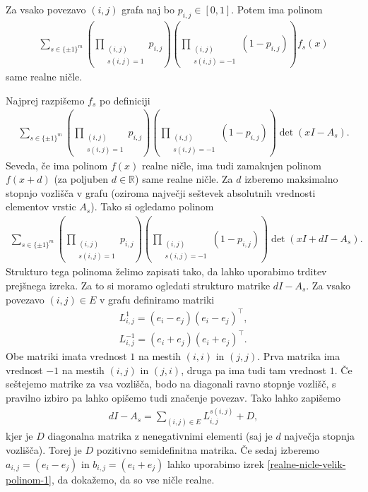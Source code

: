 \begin{izrek}\label{nicle-prepletenih-so-realne}
    Za vsako povezavo \((i,j)\) grafa naj bo \(p_{i,j}\in [0,1]\). Potem ima polinom
    \begin{align*}
        \sum_{s\in \{\pm 1\}^m} \left(\prod_{\substack{(i,j) \\s(i,j)=1}} p_{i,j}\right) \left(\prod_{\substack{(i,j)\\s(i,j)=-1}} (1- p_{i,j})\right) f_s(x)
    \end{align*}
    same realne ničle.
\end{izrek}
\begin{dokaz}
    Najprej razpišemo \(f_s\) po definiciji
    \begin{align*}
        \sum_{s\in \{\pm 1\}^m} \left(\prod_{\substack{(i,j) \\s(i,j)=1}} p_{i,j}\right) \left(\prod_{\substack{(i,j)\\s(i,j)=-1}} (1- p_{i,j})\right) \det(xI - A_s).
    \end{align*}
    Seveda, če ima polinom \(f(x)\) realne ničle, ima tudi zamaknjen polinom \(f(x+d)\) (za poljuben \(d\in \mathbb R\)) same realne ničle. Za \(d\) izberemo maksimalno stopnjo vozlišča v grafu (oziroma največji seštevek absolutnih vrednosti elementov vrstic \(A_s\)). Tako si ogledamo polinom
    \begin{align*}
        \sum_{s\in \{\pm 1\}^m} \left(\prod_{\substack{(i,j) \\s(i,j)=1}} p_{i,j}\right) \left(\prod_{\substack{(i,j)\\s(i,j)=-1}} (1- p_{i,j})\right) \det(xI + dI - A_s).
    \end{align*}
    Strukturo tega polinoma želimo zapisati tako, da lahko uporabimo trditev prejšnega izreka. Za to si moramo ogledati strukturo matrike \(dI - A_s\). Za vsako povezavo \((i,j)\in E\) v grafu definiramo matriki
    \begin{align*}
        L_{i,j}^1 = (e_i-e_j)(e_i-e_j)^\top, \\
        L_{i,j}^{-1} = (e_i+e_j)(e_i+e_j)^\top.
    \end{align*}
    Obe matriki imata vrednost \(1\) na mestih \((i,i)\) in \((j,j)\). Prva matrika ima vrednost \(-1\) na mestih \((i,j)\) in \((j,i)\), druga pa ima tudi tam vrednost \(1\). Če seštejemo matrike za vsa vozlišča, bodo na diagonali ravno stopnje vozlišč, s pravilno izbiro pa lahko opišemo tudi značenje povezav. Tako lahko zapišemo
    \begin{align*}
        dI - A_s = \sum_{(i,j)\in E} L_{i,j}^{s(i,j)} + D,
    \end{align*}
    kjer je \(D\) diagonalna matrika z nenegativnimi elementi (saj je \(d\) največja stopnja vozlišča). Torej je \(D\) pozitivno semidefinitna matrika. Če sedaj izberemo \(a_{i,j} = (e_i-e_j)\) in \(b_{i,j} = (e_i+e_j)\) lahko uporabimo izrek \ref{realne-nicle-velik-polinom-1}, da dokažemo, da so vse ničle realne.
\end{dokaz}

